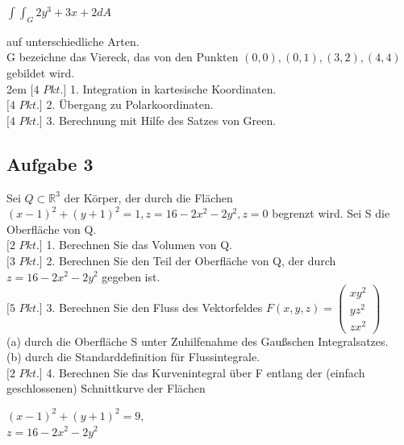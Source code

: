 \documentclass[11pt,final]{scrreprt}
\newcommand{\R} {\mathbb R}
\begin{document}
\begin{center}
$ \int\int_G 2y^3+3x+2 dA $
\end{center}

auf unterschiedliche Arten.\\
G bezeichne das Viereck, das von den Punkten $(0, 0), (0, 1), (3, 2), (4, 4)$ gebildet wird.\\

\begingroup
\leftskip2em 
$[4$ $Pkt.]$ 1. Integration in kartesische Koordinaten.\\
$[4$ $Pkt.]$ 2. Übergang zu Polarkoordinaten.\\
$[4$ $Pkt.]$ 3. Berechnung mit Hilfe des Satzes von Green.\\
\par	
\endgroup

\subsection*{Aufgabe 3}

Sei $Q \subset \R^3$ der Körper, der durch die Flächen $(x-1)^2 + (y + 1)^2=1, z=16-2x^2-2y^2,z=0$ begrenzt wird. Sei S die Oberfläche von Q.\\

$[2$ $Pkt.]$ 1. Berechnen Sie das Volumen von Q.\\

$[3$ $Pkt.]$ 2. Berechnen Sie den Teil der Oberfläche von Q, der durch $z=16-2x^2-2y^2$ gegeben ist.\\

$[5$ $Pkt.]$ 3. Berechnen Sie den Fluss des Vektorfeldes $F(x, y, z) =\left(\begin{matrix}
xy^2\\yz^2\\zx^2
\end{matrix}\right)$\\
\hspace*{2em}(a) durch die Oberfläche S unter Zuhilfenahme des Gaußschen Integralsatzes.\\
\hspace*{2em}(b) durch die Standarddefinition für Flussintegrale.\\

$[2$ $Pkt.]$ 4. Berechnen Sie das Kurvenintegral über F entlang der (einfach geschlossenen) Schnittkurve der Flächen\\
\begin{center}
$(x-1)^2 + (y + 1)^2=9,$\\
$z=16-2x^2-2y^2$
\end{center}
\end{document}
